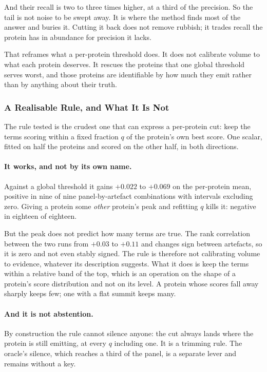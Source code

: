 And their recall is two to three times higher, at a third of the precision. So
the tail is not noise to be swept away. It is where the method finds most of
the answer and buries it. Cutting it back does not remove rubbish; it trades
recall the protein has in abundance for precision it lacks.

That reframes what a per-protein threshold does. It does not calibrate volume
to what each protein deserves. It rescues the proteins that one global
threshold serves worst, and those proteins are identifiable by how much they
emit rather than by anything about their truth.

\subsubsection{A Realisable Rule, and What It Is Not}

The rule tested is the crudest one that can express a per-protein cut: keep the
terms scoring within a fixed fraction $q$ of the protein's own best score. One
scalar, fitted on half the proteins and scored on the other half, in both
directions.

\paragraph{It works, and not by its own name.} Against a global threshold it
gains $+0.022$ to $+0.069$ on the per-protein mean, positive in nine of nine
panel-by-artefact combinations with intervals excluding zero. Giving a protein
some \emph{other} protein's peak and refitting $q$ kills it: negative in
eighteen of eighteen.

But the peak does not predict how many terms are true. The rank correlation
between the two runs from $+0.03$ to $+0.11$ and changes sign between
artefacts, so it is zero and not even stably signed. The rule is therefore not
calibrating volume to evidence, whatever its description suggests. What it
does is keep the terms within a relative band of the top, which is an operation
on the shape of a protein's score distribution and not on its level. A protein
whose scores fall away sharply keeps few; one with a flat summit keeps many.

\paragraph{And it is not abstention.} By construction the rule cannot silence
anyone: the cut always lands where the protein is still emitting, at every $q$
including one. It is a trimming rule. The oracle's silence, which reaches a
third of the panel, is a separate lever and remains without a key.

